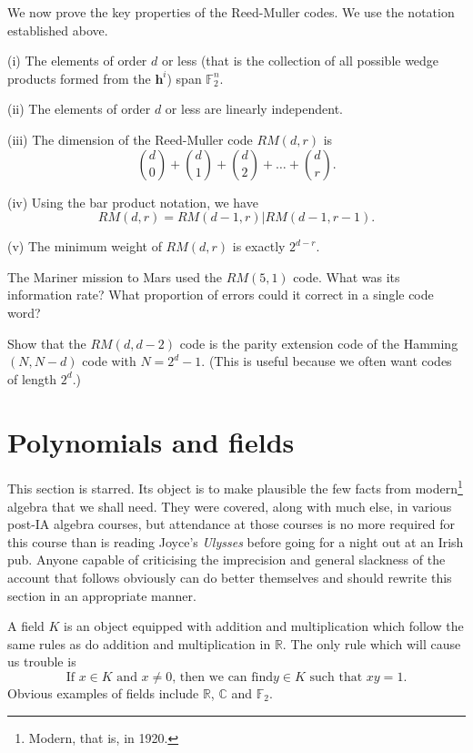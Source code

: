 We now prove the key properties of the Reed-Muller
codes. We use the notation established above.
\begin{theorem}\label{theorem Reed}
(i) The elements of order $d$
or less (that is the collection of all possible wedge products
formed from the ${\mathbf h}^{i}$) span
${\mathbb F}^{n}_{2}$.

(ii) The elements of order $d$
or less are linearly independent.

(iii) The dimension of the Reed-Muller code $RM(d,r)$
is
\[\binom{d}{0}+\binom{d}{1}+\binom{d}{2}
+\dots+\binom{d}{r}.\]

(iv) Using the bar product notation, we
have
\[RM(d,r)=RM(d-1,r)|RM(d-1,r-1).\]

(v) The minimum weight of $RM(d,r)$ is exactly
$2^{d-r}$.
\end{theorem}
\begin{exercise} The Mariner mission to Mars used
the $RM(5,1)$ code. What was its information
rate? What proportion of errors could it correct
in a single code word?
\end{exercise}
\begin{exercise} Show that the $RM(d,d-2)$ code is the
parity extension code of the Hamming $(N,N-d)$ code
with $N=2^{d}-1$. (This is useful because we often
want codes of length $2^{d}$.)
\end{exercise}
\section{Polynomials and fields} This section is
starred. Its
object is to make plausible the few facts from
modern\footnote{Modern, that is, in 1920.} algebra
that we shall need. They were covered, along with
much else, in various post-IA algebra courses,
but attendance at those courses is no more
required for this course than is reading Joyce's
\emph{Ulysses} before going for a night out at
an Irish pub. Anyone capable of criticising
the imprecision and general slackness of the
account that follows obviously can do better
themselves and should rewrite this section in an appropriate
manner.

A field $K$ is an object equipped with addition
and multiplication which follow the same rules
as do addition and multiplication in ${\mathbb R}$.
The only rule which will cause us trouble
is
\begin{equation*}
\text{If $x\in K$ and $x\neq 0$, then we can find
$y\in K$ such that $xy=1$.}\tag*{$\bigstar$}
\end{equation*}
Obvious examples of fields include ${\mathbb R}$, ${\mathbb C}$
and ${\mathbb F}_{2}$.

